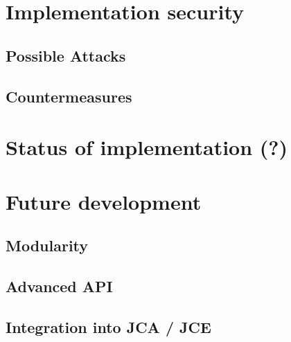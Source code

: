 \section{Implementation security}

\subsection{Possible Attacks}

\subsection{Countermeasures}


\section{Status of implementation (?)}


\section{Future development}

\subsection{Modularity}

\subsection{Advanced API}

\subsection{Integration into JCA / JCE}